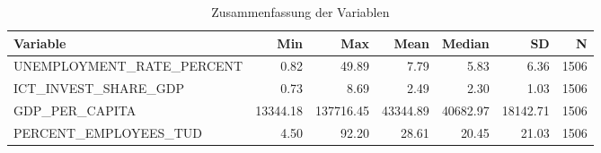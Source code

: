 \begin{table}[!h]
\centering
\caption{Zusammenfassung der Variablen}
\centering
\begin{tabular}[t]{lrrrrrr}
\toprule
Variable & Min & Max & Mean & Median & SD & N\\
\midrule
UNEMPLOYMENT\_RATE\_PERCENT & 0.82 & 49.89 & 7.79 & 5.83 & 6.36 & 1506\\
ICT\_INVEST\_SHARE\_GDP & 0.73 & 8.69 & 2.49 & 2.30 & 1.03 & 1506\\
GDP\_PER\_CAPITA & 13344.18 & 137716.45 & 43344.89 & 40682.97 & 18142.71 & 1506\\
PERCENT\_EMPLOYEES\_TUD & 4.50 & 92.20 & 28.61 & 20.45 & 21.03 & 1506\\
\bottomrule
\end{tabular}
\end{table}
